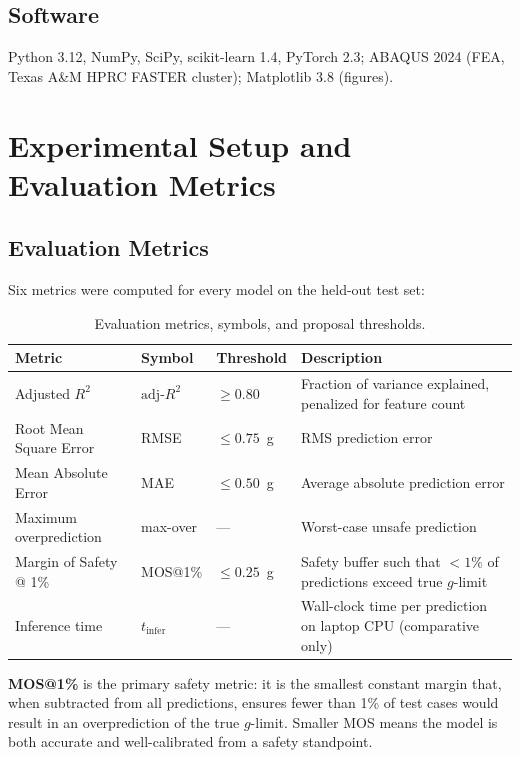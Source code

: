 \documentclass[10pt,letterpaper]{article}
\newcommand{\Rsq}{R^2}
\newcommand{\adjRsq}{\text{adj-}R^2}
\begin{document}
\subsection{Software}

Python 3.12, NumPy, SciPy, scikit-learn 1.4, PyTorch 2.3; ABAQUS 2024 (FEA, Texas A\&M
HPRC FASTER cluster); Matplotlib 3.8 (figures).

\section{Experimental Setup and Evaluation Metrics}

\subsection{Evaluation Metrics}

Six metrics were computed for every model on the held-out test set:

\begin{table}[H]
  \caption{Evaluation metrics, symbols, and proposal thresholds.}
  \label{tab:metrics}
  \centering\small
  \begin{tabularx}{\textwidth}{@{}lllX@{}}
    \toprule
    \textbf{Metric} & \textbf{Symbol} & \textbf{Threshold} & \textbf{Description} \\
    \midrule
    Adjusted $\Rsq$       & $\adjRsq$  & $\geq 0.80$ &
      Fraction of variance explained, penalized for feature count \\
    Root Mean Square Error & RMSE      & $\leq 0.75$~g &
      RMS prediction error \\
    Mean Absolute Error    & MAE       & $\leq 0.50$~g &
      Average absolute prediction error \\
    Maximum overprediction & max-over  & ---           &
      Worst-case unsafe prediction \\
    Margin of Safety @ 1\%& MOS@1\%   & $\leq 0.25$~g &
      Safety buffer such that ${<}1\%$ of predictions exceed true $g$-limit \\
    Inference time         & $t_\text{infer}$ & ---   &
      Wall-clock time per prediction on laptop CPU (comparative only) \\
    \bottomrule
  \end{tabularx}
\end{table}

\textbf{MOS@1\%} is the primary safety metric: it is the smallest constant margin that,
when subtracted from all predictions, ensures fewer than 1\% of test cases would result in
an overprediction of the true $g$-limit. Smaller MOS means the model is both accurate and
well-calibrated from a safety standpoint.
\end{document}
